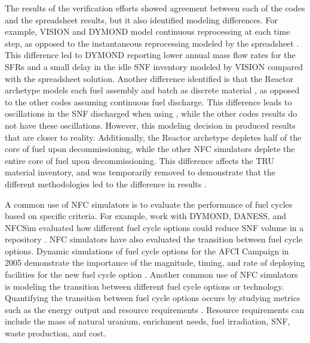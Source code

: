 The results of the verification efforts showed agreement between each 
of the codes and the spreadsheet results, but it also identified modeling 
differences. For example, \gls{VISION} and \gls{DYMOND} model continuous 
reprocessing at each time step, as opposed to the instantaneous 
reprocessing modeled by the spreadsheet \cite{feng_standardized_2016}. 
This difference led to \gls{DYMOND} reporting lower annual mass flow 
rates for the \glspl{SFR} and a small delay in the idle \gls{SNF} 
inventory modeled by \gls{VISION} compared with the spreadsheet 
solution. 
Another difference identified is that the \Cycamore Reactor 
archetype models each fuel assembly and batch as discrete material 
\cite{bae_standardized_2019}, as 
opposed to the other codes assuming continuous fuel discharge. 
This difference leads to oscillations in the \gls{SNF} discharged 
when using \Cyclus, while the other codes results do not have these 
oscillations.
However, this modeling decision in \Cyclus produced results that 
are closer to reality. 
Additionally, the \Cycamore Reactor archetype depletes half of the 
core of fuel upon decommissioning, while the other \gls{NFC} simulators 
deplete the entire core of fuel upon decommissioning. This 
difference affects the \gls{TRU} material inventory, and was 
temporarily removed to demonstrate that the different 
methodologies led to the difference in results \cite{bae_standardized_2019}.

A common use of \gls{NFC} simulators is to evaluate the performance 
of fuel cycles based on specific criteria. 
For example, work with \gls{DYMOND}, \gls{DANESS}, 
and \gls{NFCSim} evaluated how different fuel cycle options 
could reduce \gls{SNF} volume in a repository \cite{yacout_dynamic_2004}. 
\gls{NFC} simulators have also evaluated the transition between fuel cycle 
options. Dynamic simulations of fuel cycle options for the \gls{AFCI}
Campaign in 2005 demonstrate the importance of the magnitude, timing, 
and rate of deploying facilities for the new fuel cycle option 
\cite{piet_assessment_2011}.
Another common use of \gls{NFC} simulators is modeling the transition 
between 
different fuel cycle options or technology. Quantifying the transition 
between fuel cycle options occurs by studying metrics such as the 
energy output and resource requirements \cite{del_cul_advanced_2010}. 
Resource requirements can include the mass of natural uranium, enrichment 
needs, fuel irradiation, \gls{SNF}, waste production, and cost. 

